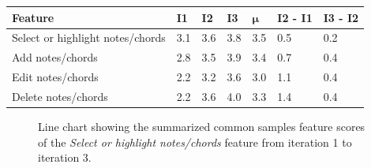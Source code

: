 		\begin{table}[H]
		  \centering
		   \label{tab:summarized-common-samples}
		  \begin{tabular}{|p{4cm}|R{.7cm}|R{.7cm}|R{.7cm}|R{.7cm}|R{1.5cm}|R{1.5cm}|}
		  	\hline
		  	\textbf{Feature} & \textbf{I1} & \textbf{I2} & \textbf{I3} & \begin{math}\bm{\mu}\end{math} & \textbf{I2 - I1} & \textbf{I3 - I2} \\ \hline

		  	Select or highlight notes/chords 	& 3.1 & 3.6 & 3.8 & 3.5 & 0.5 & 0.2 \\ \hline
			Add notes/chords 						& 2.8 & 3.5 & 3.9 & 3.4 & 0.7 & 0.4 \\ \hline
			Edit notes/chords 						& 2.2 & 3.2 & 3.6 & 3.0 & 1.1 & 0.4 \\ \hline
			Delete notes/chords 					& 2.2 & 3.6 & 4.0 & 3.3 & 1.4 & 0.4 \\ \hline
		  	
		  \end{tabular}
		\end{table}

		\begin{figure}[H]
			\centering
		    \caption{Line chart showing the summarized common samples feature scores of the \textit{Select or highlight notes/chords} feature from iteration 1 to iteration 3.}
		    \label{fig:select-line}
		\end{figure} 

